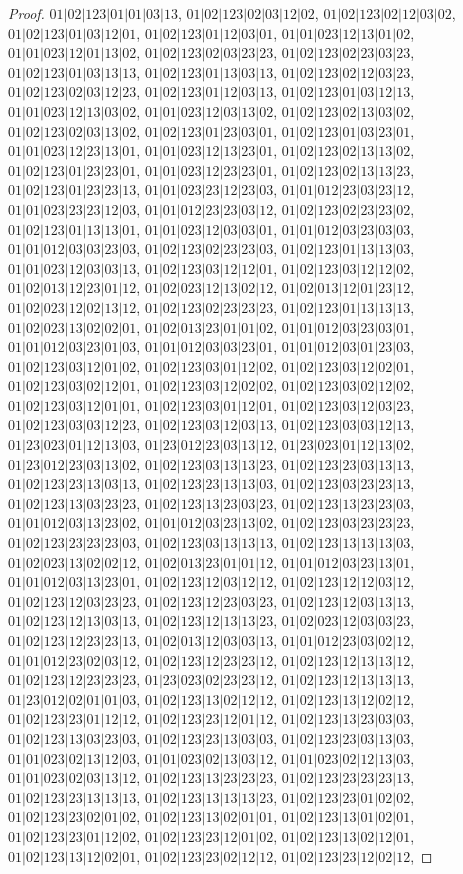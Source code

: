\documentclass[12pt]{article}
\theoremstyle{plain}
\theoremstyle{definition}
\theoremstyle{remark}
\begin{document}
\begin{proof}
$01|02|123|01|01|03|13$, $01|02|123|02|03|12|02$, $01|02|123|02|12|03|02$, $01|02|123|01|03|12|01$, $01|02|123|01|12|03|01$, $01|01|023|12|13|01|02$, $01|01|023|12|01|13|02$, $01|02|123|02|03|23|23$, $01|02|123|02|23|03|23$, $01|02|123|01|03|13|13$, $01|02|123|01|13|03|13$, $01|02|123|02|12|03|23$, $01|02|123|02|03|12|23$, $01|02|123|01|12|03|13$, $01|02|123|01|03|12|13$, $01|01|023|12|13|03|02$, $01|01|023|12|03|13|02$, $01|02|123|02|13|03|02$, $01|02|123|02|03|13|02$, $01|02|123|01|23|03|01$, $01|02|123|01|03|23|01$, $01|01|023|12|23|13|01$, $01|01|023|12|13|23|01$, $01|02|123|02|13|13|02$, $01|02|123|01|23|23|01$, $01|01|023|12|23|23|01$, $01|02|123|02|13|13|23$, $01|02|123|01|23|23|13$, $01|01|023|23|12|23|03$, $01|01|012|23|03|23|12$, $01|01|023|23|23|12|03$, $01|01|012|23|23|03|12$, $01|02|123|02|23|23|02$, $01|02|123|01|13|13|01$, $01|01|023|12|03|03|01$, $01|01|012|03|23|03|03$, $01|01|012|03|03|23|03$, $01|02|123|02|23|23|03$, $01|02|123|01|13|13|03$, $01|01|023|12|03|03|13$, $01|02|123|03|12|12|01$, $01|02|123|03|12|12|02$, $01|02|013|12|23|01|12$, $01|02|023|12|13|02|12$, $01|02|013|12|01|23|12$, $01|02|023|12|02|13|12$, $01|02|123|02|23|23|23$, $01|02|123|01|13|13|13$, $01|02|023|13|02|02|01$, $01|02|013|23|01|01|02$, $01|01|012|03|23|03|01$, $01|01|012|03|23|01|03$, $01|01|012|03|03|23|01$, $01|01|012|03|01|23|03$, $01|02|123|03|12|01|02$, $01|02|123|03|01|12|02$, $01|02|123|03|12|02|01$, $01|02|123|03|02|12|01$, $01|02|123|03|12|02|02$, $01|02|123|03|02|12|02$, $01|02|123|03|12|01|01$, $01|02|123|03|01|12|01$, $01|02|123|03|12|03|23$, $01|02|123|03|03|12|23$, $01|02|123|03|12|03|13$, $01|02|123|03|03|12|13$, $01|23|023|01|12|13|03$, $01|23|012|23|03|13|12$, $01|23|023|01|12|13|02$, $01|23|012|23|03|13|02$, $01|02|123|03|13|13|23$, $01|02|123|23|03|13|13$, $01|02|123|23|13|03|13$, $01|02|123|23|13|13|03$, $01|02|123|03|23|23|13$, $01|02|123|13|03|23|23$, $01|02|123|13|23|03|23$, $01|02|123|13|23|23|03$, $01|01|012|03|13|23|02$, $01|01|012|03|23|13|02$, $01|02|123|03|23|23|23$, $01|02|123|23|23|23|03$, $01|02|123|03|13|13|13$, $01|02|123|13|13|13|03$, $01|02|023|13|02|02|12$, $01|02|013|23|01|01|12$, $01|01|012|03|23|13|01$, $01|01|012|03|13|23|01$, $01|02|123|12|03|12|12$, $01|02|123|12|12|03|12$, $01|02|123|12|03|23|23$, $01|02|123|12|23|03|23$, $01|02|123|12|03|13|13$, $01|02|123|12|13|03|13$, $01|02|123|12|13|13|23$, $01|02|023|12|03|03|23$, $01|02|123|12|23|23|13$, $01|02|013|12|03|03|13$, $01|01|012|23|03|02|12$, $01|01|012|23|02|03|12$, $01|02|123|12|23|23|12$, $01|02|123|12|13|13|12$, $01|02|123|12|23|23|23$, $01|23|023|02|23|23|12$, $01|02|123|12|13|13|13$, $01|23|012|02|01|01|03$, $01|02|123|13|02|12|12$, $01|02|123|13|12|02|12$, $01|02|123|23|01|12|12$, $01|02|123|23|12|01|12$, $01|02|123|13|23|03|03$, $01|02|123|13|03|23|03$, $01|02|123|23|13|03|03$, $01|02|123|23|03|13|03$, $01|01|023|02|13|12|03$, $01|01|023|02|13|03|12$, $01|01|023|02|12|13|03$, $01|01|023|02|03|13|12$, $01|02|123|13|23|23|23$, $01|02|123|23|23|23|13$, $01|02|123|23|13|13|13$, $01|02|123|13|13|13|23$, $01|02|123|23|01|02|02$, $01|02|123|23|02|01|02$, $01|02|123|13|02|01|01$, $01|02|123|13|01|02|01$, $01|02|123|23|01|12|02$, $01|02|123|23|12|01|02$, $01|02|123|13|02|12|01$, $01|02|123|13|12|02|01$, $01|02|123|23|02|12|12$, $01|02|123|23|12|02|12$, 
\end{proof}
\end{document}
